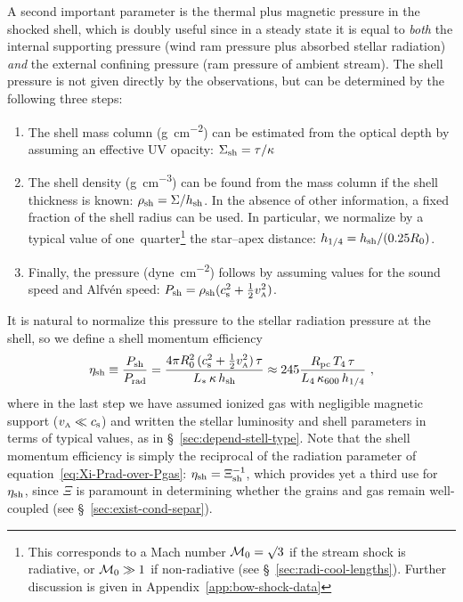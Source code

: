 A second important parameter is the thermal plus magnetic pressure in
the shocked shell, which is doubly useful since in a steady state it
is equal to \emph{both} the internal supporting pressure (wind ram
pressure plus absorbed stellar radiation) \emph{and} the external
confining pressure (ram pressure of ambient stream).  The shell
pressure is not given directly by the observations, but can be
determined by the following three steps:
\begin{enumerate}[P1.]
\item \label{P1} The shell mass column (\si{g.cm^{-2}}) can be
  estimated from the optical depth by assuming an effective UV
  opacity: \(\Sigma_{\text{sh}} = \tau / \kappa\)
\item \label{P2} The shell density (\si{g.cm^{-3}}) can be found from
  the mass column if the shell thickness is known:
  \(\rho_{\text{sh}} = \Sigma / h_{\text{sh}}\).  In the absence of other
  information, a fixed fraction of the shell radius can be used.  In
  particular, we normalize by a typical value of
  one~quarter\footnote{%
    This corresponds to a Mach number \(\mathcal{M}_0 = \surd 3\) if the stream
    shock is radiative, or \(\mathcal{M}_0 \gg 1\) if non-radiative (see
    \S~\ref{sec:radi-cool-lengths}).  Further discussion is given in
    Appendix~\ref{app:bow-shock-data}} %
  the star--apex distance: \(h_{1/4} = h_{\text{sh}} / (0.25 R_0)\).
\item \label{P3} Finally, the pressure (\si{dyne.cm^{-2}}) follows by
  assuming values for the sound speed and Alfvén speed:
  \(P_{\text{sh}} = \rho_{\text{sh}} (c_{\text{s}}^2 + \frac12 v_{\scriptscriptstyle\text{A}}^2) \).
\end{enumerate}
It is natural to normalize this pressure to the stellar radiation
pressure at the shell, so we define a shell momentum efficiency
\newcommand\pc{\ensuremath{_{\text{pc}}}}
\begin{equation}
  \label{eq:eta-shell}
  \eta\shell \equiv \frac{P\shell}{P\rad}
  = \frac{4\pi R_0^2\, (\sound^2 + \frac12 v\alfven^2)\, \tau}{L_*\, \kappa\, h\shell}
  \approx 245 \frac{R\pc \, T_4 \, \tau}{L_4 \, \kappa_{600} \, h_{1/4}} \ , 
\end{equation}
where in the last step we have assumed ionized gas with negligible
magnetic support (\(v_{\scriptscriptstyle\text{A}} \ll c_{\text{s}}\)) and written the stellar
luminosity and shell parameters in terms of typical values, as in
\S~\ref{sec:depend-stell-type}.  Note that the shell momentum
efficiency is simply the reciprocal of the radiation parameter of
equation~\eqref{eq:Xi-Prad-over-Pgas}:
\(\eta_{\text{sh}} = \Xi_{\text{sh}}^{-1}\), which provides yet a third use for
\(\eta_{\text{sh}}\), since \(\Xi\) is paramount in determining whether the
grains and gas remain well-coupled (see
\S~\ref{sec:exist-cond-separ}).


